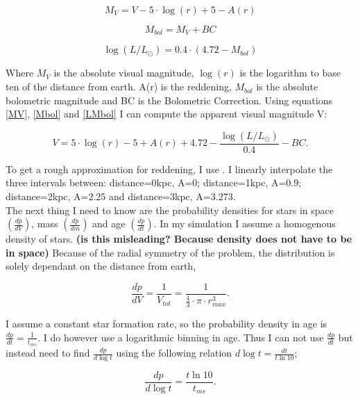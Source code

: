 \documentclass[a4paper,10pt]{article}
\begin{document}
 \begin{equation}
  M_{V}=V-5\cdot\log(r)+5-A(r)
  \label{MV}
 \end{equation}
 
 \begin{equation}
  M_{bol}=M_{V}+BC
  \label{Mbol}
 \end{equation}
 
 \begin{equation}
  \log(L/L_\odot)=0.4\cdot(4.72-M_{bol})
  \label{LMbol}
 \end{equation}
 
 Where $M_{V}$ is the absolute visual magnitude, $\log(r)$ is the logarithm to base ten of the distance from earth. A(r) is the reddening,
 $M_{bol}$ is the absolute bolometric magnitude and BC is the Bolometric Correction. Using equations \ref{MV}, \ref{Mbol} and \ref{LMbol}
 I can compute the apparent visual magnitude V:
 
 \begin{equation}
  V=5\cdot\log(r)-5+A(r)+4.72-\frac{\log(L/L_\odot)}{0.4}-BC.
 \end{equation}
 
 To get a rough approximation for reddening, I use \citet*[Figure 9]{2005AJ....130..659A}. I linearly interpolate the three intervals between:
 distance=0kpc, A=0; distance=1kpc, A=0.9; distance=2kpc, A=2.25 and distance=3kpc, A=3.273.\\
 The next thing I need to know are the probability densities for stars in space $\left(\frac{dp}{dV}\right)$, mass 
 $\left(\frac{dp}{dm}\right)$ and age $\left(\frac{dp}{dt}\right)$. In my simulation I assume a homogenous density of stars. \textbf{(is this 
 misleading? Because density does not have to be in space)} Because of
 the radial symmetry of the problem, the distribution is solely dependant on the distance from earth,
 
 \begin{equation}
  \frac{dp}{dV}=\frac{1}{V_{tot}}=\frac{1}{\frac43\cdot\pi\cdot r_{max}^3}.
  \label{dpdV}
 \end{equation}
 
 I assume a constant star formation rate, so the probability density in age is $\frac{dp}{dt}=\frac{1}{t_{ms}}$. I do however 
 use a logarithmic binning in age. Thus I can not use $\frac{dp}{dt}$ but instead need to find $\frac{dp}{d\log t}$ using the following 
 relation $d\log t=\frac{dt}{t \ln 10}$; 

 \begin{equation}
  \frac{dp}{d\log t}=\frac{t\ln 10}{t_{ms}}.
 \end{equation}
 
\end{document}

